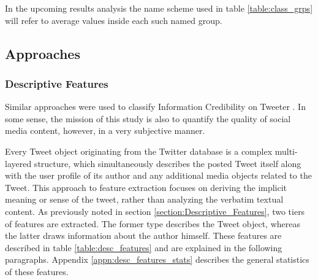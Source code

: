 		In the upcoming results analysis the name scheme used in table \ref{table:class_grps} will refer to average values inside each such named group. 
	
	\subsection{Approaches}
	
		\subsubsection{Descriptive Features}
			Similar approaches were used to classify Information Credibility on Tweeter \cite{castillo2011information}. In some sense, the mission of this study is also to quantify the quality of social media content, however, in a very subjective manner.
			\par	
		
			Every Tweet object originating from the Twitter database is a complex multi-layered structure, which  simultaneously describes the posted Tweet itself along with the user profile of its author and any additional media objects related to the Tweet. This approach to feature extraction focuses on deriving the implicit meaning or sense of the tweet, rather than analyzing the verbatim textual content. As previously noted in section \ref{section:Descriptive_Features}, two tiers of features are extracted. The former type describes the Tweet object, whereas the latter draws information about the author himself. These features are described in table \ref{table:desc_features} and are explained in the following paragraphs. Appendix \ref{appn:desc_features_stats} describes the general statistics of these features. 
			
